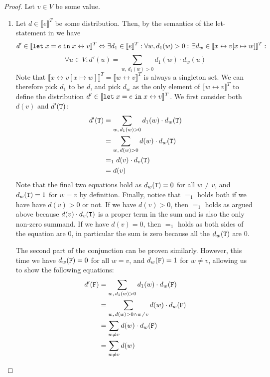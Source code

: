 \begin{proof}
	Let $v \in V$ be some value.
	\begin{enumerate}
		\item Let $d \in \llbracket e \rrbracket^T$ be some distribution.
		Then, by the semantics of the let-statement in  we have
		$$d' \in \llbracket \texttt{let}\; x = e \;\texttt{in}\;  x \leftrightarrow v \rrbracket^T \Leftrightarrow \exists d_1 \in \llbracket e \rrbracket^T: \forall w, d_1(w) > 0: \,\exists d_{w} \in \llbracket x\leftrightarrow v [x \mapsto w] \rrbracket^T: $$
		$$ \forall u \in V : d'(u) = \sum_{w,\, d_1(w) > 0} d_1(w) \cdot d_{w}(u)$$
		Note that $\llbracket x\leftrightarrow v[x \mapsto w] \rrbracket^T = \llbracket w\leftrightarrow v \rrbracket^T$ is always a singleton set. 
		We can therefore pick $d_1$ to be $d$, and pick $d_w$ as the only element of $\llbracket w\leftrightarrow v \rrbracket^T$ to define the distribution $d' \in \llbracket \texttt{let}\; x = e \;\texttt{in}\;  x \leftrightarrow v \rrbracket^T$.
		We first consider both $d(v)$ and $d'(\texttt{T})$:
		\begin{align*}
			d'(\texttt{T}) &= \sum_{w,\, d_1(w) > 0} d_1(w) \cdot d_{w}(\texttt{T}) \\
			&= \sum_{w,\, d(w) > 0} d(w) \cdot d_{w}(\texttt{T}) \\
			&=_1 d(v) \cdot d_{v}(\texttt{T}) \\
			&= d(v)
		\end{align*}
		Note that the final two equations hold as $d_w(\texttt{T}) = 0$ for all $w \neq v$, and $d_w(\texttt{T}) = 1$ for $w = v$ by definition.
		Finally, notice that $=_1$ holds both if we have have $d(v) > 0$ or not. 
		If we have $d(v) > 0$, then $=_1$ holds as argued above because $d(v) \cdot d_v(\texttt{T})$ is a proper term in the sum and is also the only non-zero summand.
		If we have $d(v) = 0$, then $=_1$ holds as both sides of the equation are $0$, in particular the sum is zero because all the $d_w(\texttt{T})$ are $0$.
		
		The second part of the conjunction can be proven similarly.
		However, this time we have  $d_w(\texttt{F}) = 0$ for all $w = v$, and $d_w(\texttt{F}) = 1$ for $w \neq v$, allowing us to show the following equations:
		\begin{align*}
			d'(\texttt{F}) &= \sum_{w,\, d_1(w) > 0} d_1(w) \cdot d_{w}(\texttt{F}) \\
			&= \sum_{w,\, d(w) > 0 \land w \neq v} d(w) \cdot d_{w}(\texttt{F}) \\
			&= \sum_{ w \neq v} d(w) \cdot d_{w}(\texttt{F}) \\
			&= \sum_{ w \neq v} d(w)
		\end{align*}
		

\end{enumerate}
\end{proof}
